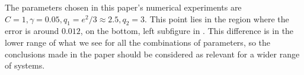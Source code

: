 \documentclass[main.tex]{subfiles}
\begin{document}
The parameters chosen in this paper's numerical experiments
are $C=1,\gamma=0.05,q_1=e^2/3\approx2.5,q_2=3$. This point lies
in the region where the error is around $0.012$, on the
bottom, left subfigure in .
This difference is in the lower range of what we see for all the
combinations of parameters, so the conclusions made in the paper
should be considered as relevant for a wider range of systems.

\biblio
\end{document}
